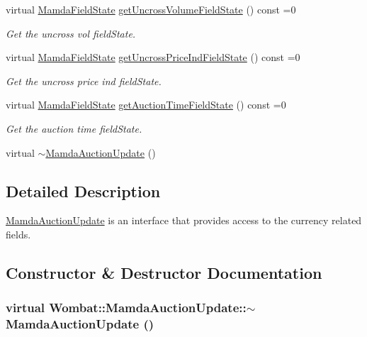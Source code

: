 \begin{CompactItemize}
virtual \hyperlink{namespaceWombat_93aac974f2ab713554fd12a1fa3b7d2a}{Mamda\-Field\-State} \hyperlink{classWombat_1_1MamdaAuctionUpdate_6ac08f0a65e4b0f68ac7e61e4ed84884}{get\-Uncross\-Volume\-Field\-State} () const =0
\begin{CompactList}\small\item\em Get the uncross vol field\-State. \item\end{CompactList}\item 
virtual \hyperlink{namespaceWombat_93aac974f2ab713554fd12a1fa3b7d2a}{Mamda\-Field\-State} \hyperlink{classWombat_1_1MamdaAuctionUpdate_a7a595ba208a8ad7f1230f727bb8449a}{get\-Uncross\-Price\-Ind\-Field\-State} () const =0
\begin{CompactList}\small\item\em Get the uncross price ind field\-State. \item\end{CompactList}\item 
virtual \hyperlink{namespaceWombat_93aac974f2ab713554fd12a1fa3b7d2a}{Mamda\-Field\-State} \hyperlink{classWombat_1_1MamdaAuctionUpdate_fffddb01aee5c4584f3a8c574c8746b1}{get\-Auction\-Time\-Field\-State} () const =0
\begin{CompactList}\small\item\em Get the auction time field\-State. \item\end{CompactList}\item 
virtual \hyperlink{classWombat_1_1MamdaAuctionUpdate_8539322678febb757715b46954ff806e}{$\sim$Mamda\-Auction\-Update} ()
\end{CompactItemize}


\subsection{Detailed Description}
\hyperlink{classWombat_1_1MamdaAuctionUpdate}{Mamda\-Auction\-Update} is an interface that provides access to the currency related fields. 



\subsection{Constructor \& Destructor Documentation}
\hypertarget{classWombat_1_1MamdaAuctionUpdate_8539322678febb757715b46954ff806e}{
\subsubsection[$\sim$MamdaAuctionUpdate]{\setlength{\rightskip}{0pt plus 5cm}virtual Wombat::Mamda\-Auction\-Update::$\sim$Mamda\-Auction\-Update ()}}
\label{classWombat_1_1MamdaAuctionUpdate_8539322678febb757715b46954ff806e}




